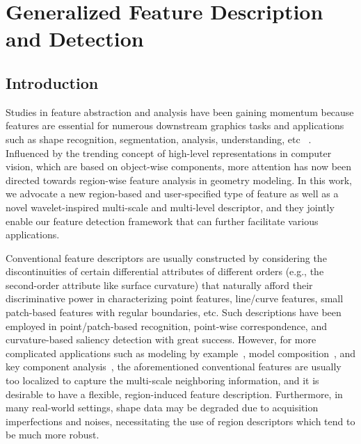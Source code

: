 \chapter{Generalized Feature Description and Detection}
\label{chap:feature}

\section{Introduction}
Studies in feature abstraction and analysis have been gaining momentum because
features are essential for numerous downstream graphics tasks and applications
such as shape recognition, segmentation, analysis, understanding, etc
~\cite{Bronstein2011,Kin-ChungAu:2012,Song:2014:MSV}. Influenced
by the trending concept of high-level representations in computer
vision, which are based on object-wise components, more
attention has now been directed towards region-wise feature analysis in
geometry modeling. In this work, we advocate a new region-based and
user-specified type of feature as well as a novel
wavelet-inspired multi-scale and multi-level descriptor, and they
jointly enable our feature detection framework that can further
facilitate various applications.

Conventional feature descriptors are usually constructed by considering
the discontinuities of certain differential attributes of different
orders (e.g., the second-order attribute like surface curvature) that
naturally afford their discriminative power in characterizing point
features, line/curve features, small patch-based features with regular
boundaries, etc. Such descriptions have been employed in point/patch-based
recognition, point-wise correspondence, and curvature-based saliency
detection with great success. However, for more complicated applications
such as modeling by example~\cite{Funkhouser:2004}, model
composition~\cite{Kreavoy:2007}, and key component
analysis~\cite{Sipiran:2012}, the aforementioned conventional features
are usually too localized to capture the multi-scale neighboring
information, and it is desirable to have a flexible, region-induced feature
description. Furthermore, in many real-world settings, shape data may be
degraded due to acquisition imperfections and noises, necessitating the
use of region descriptors which tend to be much more robust.

